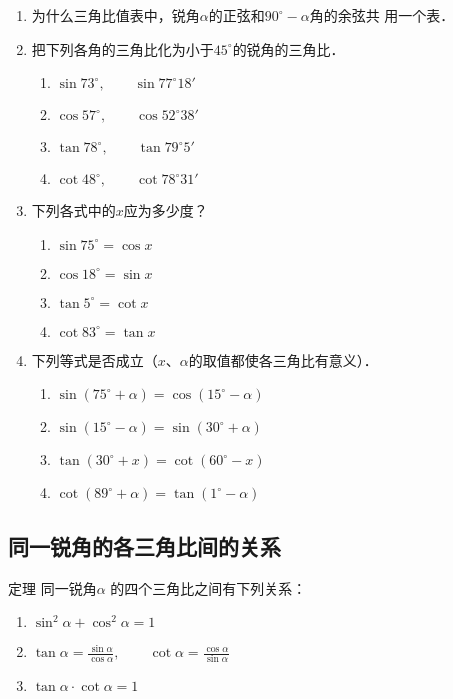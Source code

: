\begin{ex}
    \begin{enumerate}
        \item 为什么三角比值表中，锐角$\alpha$的正弦和$90^{\circ}-\alpha$角的余弦共
        用一个表．
\item 把下列各角的三角比化为小于$45^{\circ}$的锐角的三角比．
\begin{multicols}{2}
\begin{enumerate}
    \item $\sin73^{\circ},\qquad \sin77^{\circ}18'$
    \item $\cos57^{\circ},\qquad \cos52^{\circ}38'$
    \item $\tan78^{\circ},\qquad \tan79^{\circ}5'$
    \item $\cot48^{\circ},\qquad \cot78^{\circ}31'$
\end{enumerate}
\end{multicols}
\item 下列各式中的$x$应为多少度？
\begin{multicols}{2}
\begin{enumerate}
    \item $\sin75^{\circ}=\cos x$
    \item $\cos18^{\circ}=\sin x$
    \item $\tan5^{\circ}=\cot x$
    \item $\cot83^{\circ}=\tan x$
\end{enumerate}
\end{multicols}
\item 下列等式是否成立（$x$、$\alpha$的取值都使各三角比有意义）．
\begin{multicols}{2}
\begin{enumerate}
    \item $\sin(75^{\circ}+\alpha )=\cos(15^{\circ}-\alpha )$
    \item $\sin(15^{\circ}-\alpha )=\sin(30^{\circ}+\alpha )$
    \item $ \tan (30^{\circ}+x)=\cot (60^{\circ}-x)$
    \item $ \cot (89^{\circ}+\alpha )=\tan (1^{\circ}-\alpha )$
\end{enumerate}
\end{multicols}
    \end{enumerate}
\end{ex}

\subsection{同一锐角的各三角比间的关系}
\begin{blk}{定理}
    同一锐角$\alpha$ 的四个三角比之间有下列关系：
\begin{enumerate}
    \item $\sin^2\alpha  +\cos^2\alpha =1$
    \item $\tan\alpha=\frac{\sin\alpha}{\cos\alpha },\qquad \cot\alpha=\frac{\cos\alpha }{\sin\alpha }$
    \item $\tan\alpha\cdot \cot\alpha =1$
\end{enumerate}
\end{blk}

